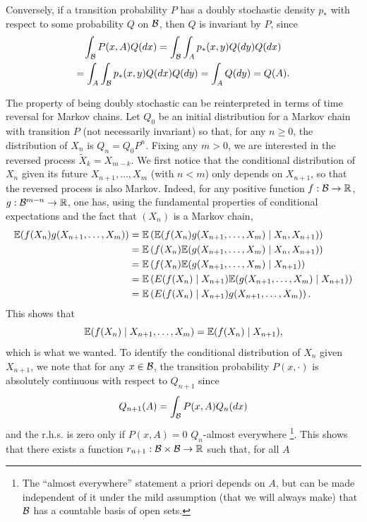 Conversely, if a transition probability $P$ has a doubly stochastic density $p_*$ with respect to some probability $Q$ on ${\mathcal B}$, then $Q$ is invariant by $P$, since
\begin{multline*}
\int_{{\mathcal B}} P(x,A) Q(dx) = \int_{{\mathcal B}} \int_A p_*(x,y) Q(dy) Q(dx) \\
= \int_{A} \int_{{\mathcal B}} p_*(x,y) Q(dx) Q(dy) =   \int_A Q(dy) = Q(A).
\end{multline*}

The property of being doubly stochastic can be reinterpreted in terms of time reversal for Markov chains. Let $Q_0$ be an initial distribution for a Markov chain with transition $P$ (not necessarily invariant) so that, for any $n\geq 0$, the distribution of $X_n$ is $Q_n = Q_0P^n$. Fixing any $m>0$, we are interested in the reversed process $\tilde X_k = X_{m-k}$. We first notice that the conditional distribution of $X_n$ given its future $X_{n+1}, \ldots, X_m$ (with $n<m$) only depends on $X_{n+1}$, so that the reversed process is also Markov. Indeed, for any positive function $f: {\mathcal B} \to {\mathbb{R}}$, $g: {\mathcal B}^{m-n} \to {\mathbb{R}}$, one has, using the fundamental properties of conditional expectations and the fact that $(X_n)$ is a Markov chain,
\begin{align*}
\bm{\mathbb E}(f(X_n) g( X_{n+1}, \ldots, X_m) ) &=  \bm{\mathbb E}\left(\bm{\mathbb E}(f(X_n) g( X_{n+1}, \ldots, X_m)\mid X_n, X_{n+1})\right)\\
&=  \bm{\mathbb E}\left(f(X_n)\bm{\mathbb E}( g( X_{n+1}, \ldots, X_m)\mid X_n, X_{n+1})\right)\\
&=  \bm{\mathbb E}\left(f(X_n)\bm{\mathbb E}( g( X_{n+1}, \ldots, X_m)\mid X_{n+1})\right)\\
&=  \bm{\mathbb E}\left(E(f(X_n)\mid X_{n+1}) \bm{\mathbb E}( g( X_{n+1}, \ldots, X_m)\mid X_{n+1})\right)\\
&=  \bm{\mathbb E}\left(E(f(X_n)\mid X_{n+1}) g( X_{n+1}, \ldots, X_m)\right).
\end{align*}
This shows that 
\[
\bm{\mathbb E}(f(X_n) \mid X_{n+1}, \ldots, X_m) = \bm{\mathbb E}(f(X_n) \mid X_{n+1}),
\]
 which is what we wanted. To identify the conditional distribution of $X_n$ given $X_{n+1}$, we note that for any $x\in {\mathcal B}$, the transition probability $P(x, \cdot)$ is absolutely continuous with respect to $Q_{n+1}$ since
\[
Q_{n+1}(A) = \int_{{\mathcal B}} P(x, A) Q_n(dx)
\]
and the r.h.s. is zero only if  $P(x, A) = 0$ $Q_n$-almost everywhere \footnote{The ``almost everywhere'' statement a priori depends on $A$, but can be made independent of it under the mild assumption (that we will always make) that ${\mathcal B}$ has a countable basis of open sets.}. This shows that there exists a function $r_{n+1}: {\mathcal B}\times {\mathcal B} \to {\mathbb{R}}$ such that, for all $A$
